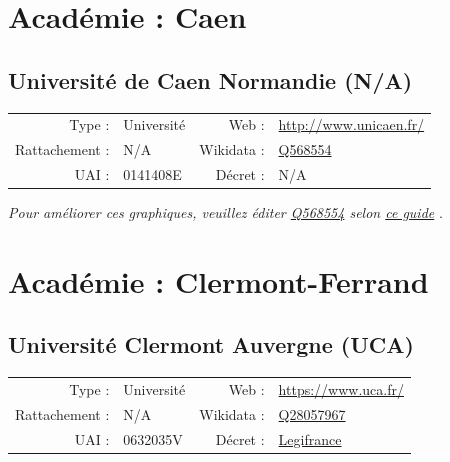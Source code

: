 \documentclass[12pt,french,landscape]{article}
\begin{document}
\newpage

\hypertarget{acaduxe9mie-caen}{%
\section{Académie : Caen}\label{acaduxe9mie-caen}}

\hypertarget{universituxe9-de-caen-normandie-na}{%
\subsection{Université de Caen Normandie
(N/A)}\label{universituxe9-de-caen-normandie-na}}

\begin{tabular*}{0.45\textwidth}{rp{2cm}rl}  
\hline  
Type : & Université & Web : &\href{http://www.unicaen.fr/}{http://www.unicaen.fr/} \\  
Rattachement : & N/A & Wikidata : & \href{https://www.wikidata.org/entity/Q568554}{Q568554} \\  
UAI : & 0141408E & Décret : & N/A \\  
\hline  
\end{tabular*}

\textit{\scriptsize Pour améliorer ces graphiques, veuillez éditer \href{https://www.wikidata.org/entity/Q568554}{Q568554}  selon \href{https://github.com/cpesr/wikidataESR/blob/master/Rmd/wikidataESR.md}{ce guide}}
.


\newpage

\hypertarget{acaduxe9mie-clermont-ferrand}{%
\section{Académie :
Clermont-Ferrand}\label{acaduxe9mie-clermont-ferrand}}

\hypertarget{universituxe9-clermont-auvergne-uca}{%
\subsection{Université Clermont Auvergne
(UCA)}\label{universituxe9-clermont-auvergne-uca}}

\begin{tabular*}{0.45\textwidth}{rp{2cm}rl}  
\hline  
Type : & Université & Web : &\href{https://www.uca.fr/}{https://www.uca.fr/} \\  
Rattachement : & N/A & Wikidata : & \href{https://www.wikidata.org/entity/Q28057967}{Q28057967} \\  
UAI : & 0632035V & Décret : & \href{https://www.legifrance.gouv.fr/affichTexte.do?cidTexte=JORFTEXT000033119145&categorieLien=id}{Legifrance} \\  
\hline  
\end{tabular*}
\end{document}
